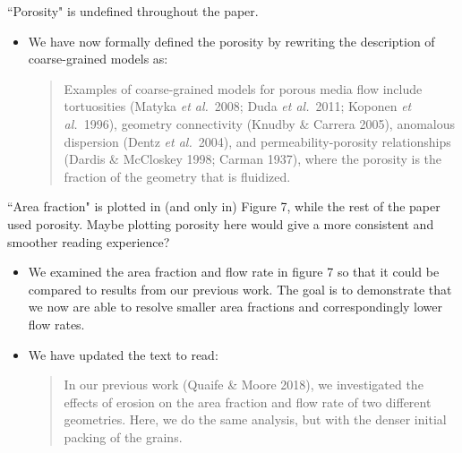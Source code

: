 \documentclass[11pt]{article}
\newcommand{\comment}[1]{{\color{blue} #1}}
\begin{document}
\noindent
\comment{``Porosity" is undefined throughout the paper.}
\begin{itemize}
  \item We have now formally defined the porosity by rewriting the
    description of coarse-grained models as:
  \begin{quotation}
  \noindent
    Examples of coarse-grained models for porous media flow include
    tortuosities (Matyka {\em et al.}~2008; Duda {\em et al.}~2011;
    Koponen {\em et al.}~1996), geometry connectivity (Knudby \& Carrera
    2005), anomalous dispersion (Dentz {\em et al.}~2004), and
    permeability-porosity relationships (Dardis \& McCloskey 1998;
    Carman 1937), where the porosity is the fraction of the geometry
    that is fluidized.
  \end{quotation}


\end{itemize}

\noindent
\comment{``Area fraction" is plotted in (and only in) Figure 7, while
the rest of the paper used porosity. Maybe plotting porosity here would
give a more consistent and smoother reading experience?}
\begin{itemize}
  \item We examined the area fraction and flow rate in figure 7 so that
    it could be compared to results from our previous work. The goal is
    to demonstrate that we now are able to resolve smaller area
    fractions and correspondingly lower flow rates.

  \item We have updated the text to read:
    \begin{quotation}
      \noindent
      In our previous work (Quaife \& Moore 2018), we investigated the
      effects of erosion on the area fraction and flow rate of two
      different geometries. Here, we do the same analysis, but with the
      denser initial packing of the grains.
    \end{quotation}

\end{itemize}
\end{document}
